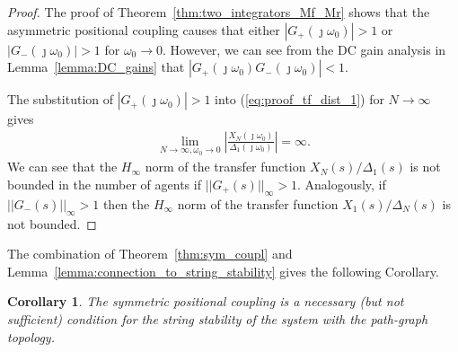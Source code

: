\documentclass[10pt,twocolumn,twoside]{IEEEtran}
\newtheorem{corollary}{Corollary}
\theoremstyle{definition}
\begin{document}
{\begin{proof}
The proof of Theorem~\ref{thm:two_integrators_Mf_Mr} shows that the asymmetric positional coupling causes that either $|G_+(\jmath\omega_0)|>1$ or $|G_-(\jmath\omega_0)|>1$ for $\omega_0 \rightarrow 0$. However, we can see from the DC gain analysis in Lemma~\ref{lemma:DC_gains} that $|G_+(\jmath\omega_0)G_-(\jmath\omega_0)|<1$.

The substitution of $|G_+(\jmath\omega_0)|>1$ into (\ref{eq:proof_tf_dist_1}) for $N\rightarrow \infty$ gives
\begin{align}
 \lim_{N \rightarrow \infty, \omega_0 \rightarrow 0} \left|\frac{X_N(\jmath\omega_0)}{\Delta_1(\jmath\omega_0)}\right|  = \infty.
\end{align}
We can see that the $H_{\infty}$ norm of the transfer function $X_N(s)/\Delta_1(s)$ is not bounded in the number of agents if $||G_+(s)||_{\infty}>1$. Analogously, if $||G_-(s)||_{\infty}>1$ then the $H_{\infty}$ norm of the transfer function $X_1(s)/\Delta_N(s)$ is not bounded.

\end{proof}

The combination of Theorem~\ref{thm:sym_coupl} and Lemma~\ref{lemma:connection_to_string_stability} gives the following Corollary.

\begin{corollary}
  The symmetric positional coupling is a necessary (but not sufficient) condition for the string stability of the system with the path-graph topology.
\end{corollary}}
\end{document}
